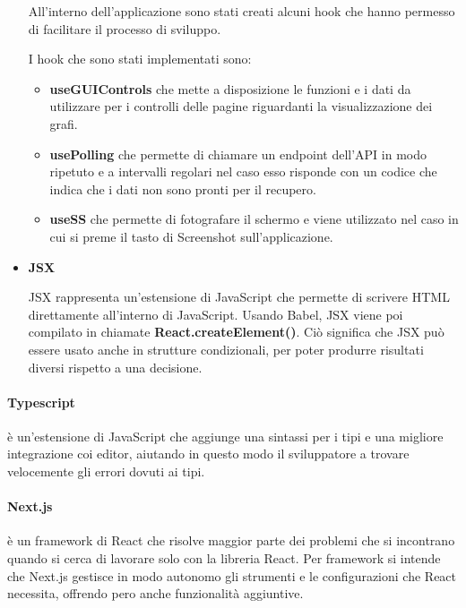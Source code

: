 \documentclass[a4paper,12pt]{report}
\begin{document}
\begin{itemize}
\begin{itemize}
				\end{itemize}
				
				All'interno dell'applicazione sono stati creati alcuni hook che hanno permesso di facilitare il processo di sviluppo. 

				I hook che sono stati implementati sono:
				\begin{itemize}
				\item \textbf{useGUIControls} che mette a disposizione le funzioni e i dati da utilizzare per i controlli delle pagine riguardanti la visualizzazione dei grafi.
				
				\item \textbf{usePolling} che permette di chiamare un endpoint dell'API in modo ripetuto e a intervalli regolari nel caso esso risponde con un codice che indica che i dati non sono pronti per il recupero.
				
				\item \textbf{useSS} che permette di fotografare il schermo e viene utilizzato nel caso in cui si preme il tasto di Screenshot sull'applicazione.			
				\end{itemize}				

				\item \textbf{JSX}

				JSX rappresenta un'estensione di JavaScript che permette di scrivere HTML direttamente all'interno di JavaScript. Usando Babel, JSX viene poi compilato in chiamate \textbf{React.createElement()}. Ciò significa che JSX può essere usato anche in strutture condizionali, per poter produrre risultati diversi rispetto a una decisione. \cite{jsxreact} 

				\end{itemize}
				
			\paragraph*{Typescript} è un'estensione di JavaScript che aggiunge una sintassi per i tipi e una migliore integrazione coi editor, aiutando in questo modo il sviluppatore a trovare velocemente gli errori dovuti ai tipi. \cite{typescript} 
			
			\paragraph*{Next.js} è un framework di React che risolve maggior parte dei problemi che si incontrano quando si cerca di lavorare solo con la libreria React. Per framework si intende che Next.js gestisce in modo autonomo gli strumenti e le configurazioni che React necessita, offrendo pero anche funzionalità aggiuntive. \cite{nextjs} 
\end{document}
